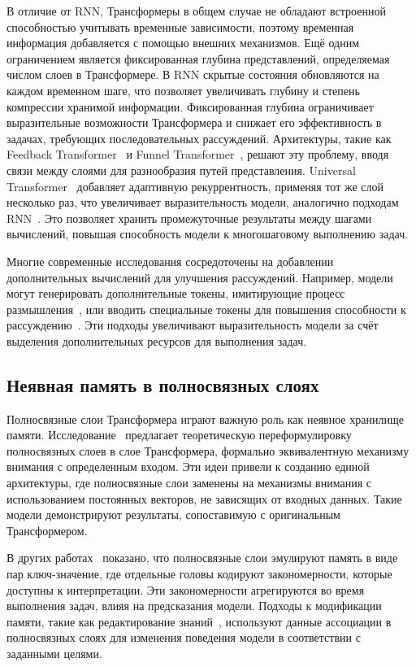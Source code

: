 В отличие от RNN, Трансформеры в общем случае не обладают встроенной способностью учитывать временные зависимости, поэтому временная информация добавляется с помощью внешних механизмов. Ещё одним ограничением является фиксированная глубина представлений, определяемая числом слоев в Трансформере. В RNN скрытые состояния обновляются на каждом временном шаге, что позволяет увеличивать глубину и степень компрессии хранимой информации. Фиксированная глубина ограничивает выразительные возможности Трансформера и снижает его эффективность в задачах, требующих последовательных рассуждений. Архитектуры, такие как Feedback Transformer~\cite{fan2020feedback-transformer} и Funnel Transformer~\cite{dai2020funnel}, решают эту проблему, вводя связи между слоями для разнообразия путей представления. Universal Transformer~\cite{dehghani2018universal-transformer} добавляет адаптивную рекуррентность, применяя тот же слой несколько раз, что увеличивает выразительность модели, аналогично подходам RNN~\cite{graves2016adaptive}. Это позволяет хранить промежуточные результаты между шагами вычислений, повышая способность модели к многошаговому выполнению задач.  

Многие современные исследования сосредоточены на добавлении дополнительных вычислений для улучшения рассуждений. Например, модели могут генерировать дополнительные токены, имитирующие процесс размышления~\cite{wei2022chain}, или вводить специальные токены для повышения способности к рассуждению~\cite{goyal2023think, pfau2024let}. Эти подходы увеличивают выразительность модели за счёт выделения дополнительных ресурсов для выполнения задач.  

\subsection{Неявная память в полносвязных слоях}

Полносвязные слои Трансформера играют важную роль как неявное хранилище памяти. Исследование~\cite{sukhbaatar2019augmenting} предлагает теоретическую переформулировку полносвязных слоев в слое Трансформера, формально эквивалентную механизму внимания с определенным входом. Эти идеи привели к созданию единой архитектуры, где полносвязные слои заменены на механизмы внимания с использованием постоянных векторов, не зависящих от входных данных. Такие модели демонстрируют результаты, сопоставимую с оригинальным Трансформером.  

В других работах~\cite{geva2020transformer} показано, что полносвязные слои эмулируют память в виде пар ключ-значение, где отдельные головы кодируют закономерности, которые доступны к интерпретации. Эти закономерности агрегируются во время выполнения задач, влияя на предсказания модели. Подходы к модификации памяти, такие как редактирование знаний~\cite{meng2022locating, meng2022mass}, используют данные ассоциации в полносвязных слоях для изменения поведения модели в соответствии с заданными целями.  

